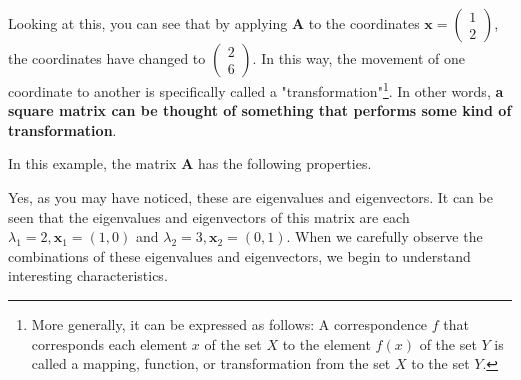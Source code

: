 \documentclass{ltjsbook}
\begin{document}
Looking at this, you can see that by applying $\bm{A}$ to the coordinates $\bm{x}=\begin{pmatrix}1\\2\end{pmatrix}$, the coordinates have changed to $\begin{pmatrix}2\\6\end{pmatrix}$. In this way, the movement of one coordinate to another is specifically called a "transformation"\footnote{More generally, it can be expressed as follows: A correspondence $f$ that corresponds each element $x$ of the set $X$ to the element $f(x)$ of the set $Y$ is called a mapping, function, or transformation from the set $X$ to the set $Y$.}. In other words, \textbf{a square matrix can be thought of something that performs some kind of transformation}.

In this example, the matrix $\bm{A}$ has the following properties.




Yes, as you may have noticed, these are eigenvalues and eigenvectors. It can be seen that the eigenvalues and eigenvectors of this matrix are each $\lambda_1=2,\bm{x}_1=(1,0)$ and $\lambda_2=3,\bm{x}_2=(0,1)$. When we carefully observe the combinations of these eigenvalues and eigenvectors, we begin to understand interesting characteristics.
\end{document}
